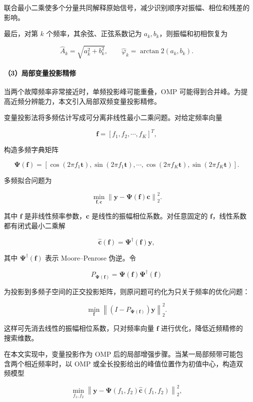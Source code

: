 联合最小二乘使多个分量共同解释原始信号，减少识别顺序对振幅、相位和残差的影响。


最后，对第 \(k\) 个频率，其余弦、正弦系数记为 \(a_k,b_k\)，则振幅和初相恢复为


\[
\hat A_k=\sqrt{a_k^2+b_k^2},
\qquad
\hat\varphi_k=\arctan2(a_k,b_k).
\]


\paragraph{（3）局部变量投影精修}


当两个故障频率非常接近时，单频投影峰可能重叠，OMP 可能得到合并峰。为提高近频分辨能力，本文引入局部双频变量投影精修。


变量投影法将多频估计写成可分离非线性最小二乘问题。对给定频率向量


\[
\mathbf f=[f_1,f_2,\cdots,f_K]^T,
\]


构造多频字典矩阵


\[
\boldsymbol\Psi(\mathbf f)=
\left[
\cos(2\pi f_1\mathbf t),\sin(2\pi f_1\mathbf t),
\cdots,
\cos(2\pi f_K\mathbf t),\sin(2\pi f_K\mathbf t)
\right].
\]


多频拟合问题为


\[
\min_{\mathbf f,\mathbf c}
\left\|
\mathbf y-\boldsymbol\Psi(\mathbf f)\mathbf c
\right\|_2^2.
\]


其中 \(\mathbf f\) 是非线性频率参数，\(\mathbf c\) 是线性的振幅相位系数。对任意固定的 \(\mathbf f\)，线性系数都有闭式最小二乘解


\[
\hat{\mathbf c}(\mathbf f)
=
\boldsymbol\Psi^\dagger(\mathbf f)\mathbf y,
\]


其中 \(\boldsymbol\Psi^\dagger(\mathbf f)\) 表示 Moore--Penrose 伪逆。令


\[
P_{\boldsymbol\Psi(\mathbf f)}
=
\boldsymbol\Psi(\mathbf f)\boldsymbol\Psi^\dagger(\mathbf f)
\]


为投影到多频子空间的正交投影矩阵，则原问题可约化为只关于频率的优化问题：


\[
\min_{\mathbf f}
\left\|
\left(I-P_{\boldsymbol\Psi(\mathbf f)}\right)\mathbf y
\right\|_2^2.
\]


这样可先消去线性的振幅相位系数，只对频率向量 \(\mathbf f\) 进行优化，降低近频精修的搜索维数。


在本文实现中，变量投影作为 OMP 后的局部增强步骤。当某一局部频带可能包含两个相近频率时，以 OMP 或全长投影给出的峰值位置作为初值中心，构造双频模型


\[
\min_{f_1,f_2}
\left\|
\mathbf y-\boldsymbol\Psi(f_1,f_2)
\hat{\mathbf c}(f_1,f_2)
\right\|_2^2,
\]


